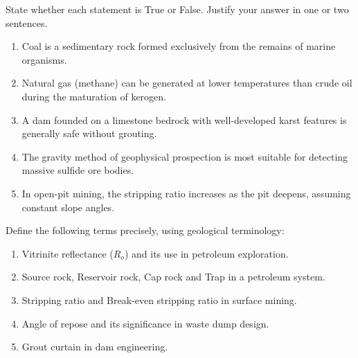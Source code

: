 \documentclass[11pt]{article}
\newcommand{\cle}[1]{{\popxbold\color{popdark}#1}}
\begin{document}
\begin{exercice}
State whether each statement is True or False. Justify your answer in one or two sentences.
\begin{enumerate}
\item Coal is a sedimentary rock formed exclusively from the remains of marine organisms.
\item Natural gas (methane) can be generated at lower temperatures than crude oil during the maturation of kerogen.
\item A dam founded on a limestone bedrock with well-developed karst features is generally safe without grouting.
\item The gravity method of geophysical prospection is most suitable for detecting massive sulfide ore bodies.
\item In open-pit mining, the stripping ratio increases as the pit deepens, assuming constant slope angles.
\end{enumerate}
\end{exercice}

\begin{exercice}
Define the following terms precisely, using geological terminology:
\begin{enumerate}
\item \cle{Vitrinite reflectance ($R_o$)} and its use in petroleum exploration.
\item \cle{Source rock}, \cle{Reservoir rock}, \cle{Cap rock} and \cle{Trap} in a petroleum system.
\item \cle{Stripping ratio} and \cle{Break-even stripping ratio} in surface mining.
\item \cle{Angle of repose} and its significance in waste dump design.
\item \cle{Grout curtain} in dam engineering.
\end{enumerate}
\end{exercice}
\end{document}
